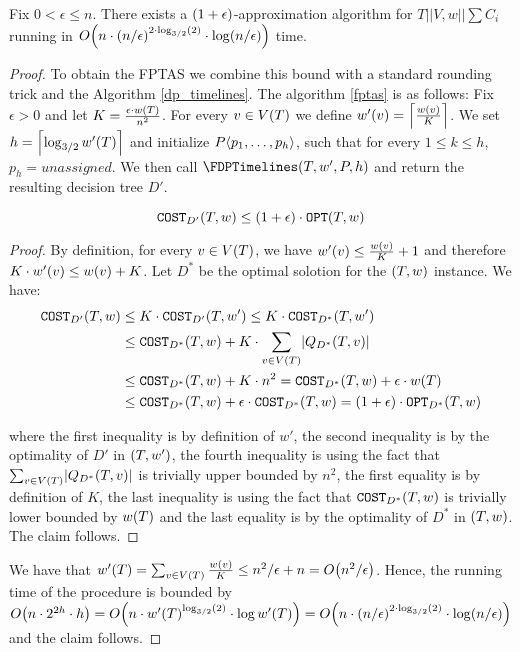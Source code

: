 \begin{theorem}
Fix $0<\epsilon\leq n$. There exists a $\br{1+\epsilon}$-approximation algorithm for $T||V,w||\sum C_i$ running in $O\br{n\cdot \br{n/\epsilon}^{2\cdot\log_{3/2}\br{2}}\cdot\log\br{n/\epsilon}}$ time. 
\begin{proof}
    
To obtain the FPTAS we combine this bound with a standard rounding trick and the Algorithm \ref{dp_timelines}. The algorithm \ref{fptas} is as follows: Fix $\epsilon>0$ and let $K=\frac{\epsilon\cdot w\br{T}}{n^2}$. For every $v\in V\br{T}$ we define $w'\br{v}=\cl{\frac{w(v)}{K}}$. We set $h = \cl{\log_{3/2}w'\br{T}}$ and initialize $P\angl{p_1,\dots,p_h}$, such that for every $1\leq k\leq h$, $p_h= \textit{unassigned}$. We then call $\FDPTimelines\br{T, w', P, h}
$ and return the resulting decision tree $D'$.

\begin{lemma}
    $$
    \COST_{D'}\br{T, w}\leq \br{1+\epsilon}\cdot \OPT\br{T,w}
    $$
    \begin{proof}
        By definition, for every $v\in V\br{T}$, we have $w'\br{v}\leq \frac{w\br{v}}{K}+1$ and therefore $K\cdot w'\br{v}\leq w\br{v}+K$. Let $D^*$ be the optimal solotion for the $\br{T,w}$ instance. We have:
        \begin{align*}
        \COST_{D'}\br{T, w}&\leq K\cdot \COST_{D'}\br{T, w'}\leq K\cdot \COST_{D^*}\br{T, w'}
        \\&\leq
        \COST_{D^*}\br{T, w}+K\cdot\sum_{v\in V\br{T}}\spr{Q_{D^*}\br{T,v}}
        \\
        &\leq 
        \COST_{D^*}\br{T, w} + K\cdot n^2 = \COST_{D^*}\br{T, w} +\epsilon\cdot w\br{T} \\&\leq
        \COST_{D^*}\br{T, w}+\epsilon\cdot \COST_{D^*}\br{T, w} = \br{1+\epsilon}\cdot\OPT_{D^*}\br{T, w}
        \end{align*}

        where the first inequality is by definition of $w'$, the second inequality is by the optimality of $D'$ in $\br{T,w'}$, the fourth inequality is using the fact that $\sum_{v\in V\br{T}}\spr{Q_{D^*}\br{T,v}}$ is trivially upper bounded by $n^2$, the first equality is by definition of $K$, the last inequality is using the fact that $\COST_{D^*}\br{T, w}$ is trivially lower bounded by $w\br{T}$ and the last equality is by the optimality of $D^*$ in $\br{T,w}$. The claim follows.
    \end{proof}
\end{lemma}

    We have that $w'\br{T}=\sum_{v\in V\br{T}}\frac{w\br{v}}{K}\leq n^2/\epsilon+n=O\br{n^2/\epsilon}$.
    Hence, the running time of the procedure is bounded by $O\br{n\cdot 2^{2h}\cdot h}=O\br{n\cdot w'\br{T}^{\log_{3/2}\br{2}}\cdot \log w'\br{T}}=O\br{n\cdot \br{n/\epsilon}^{2\cdot\log_{3/2}\br{2}}\cdot\log\br{n/\epsilon}}$ and the claim follows.
\end{proof}
\end{theorem}

